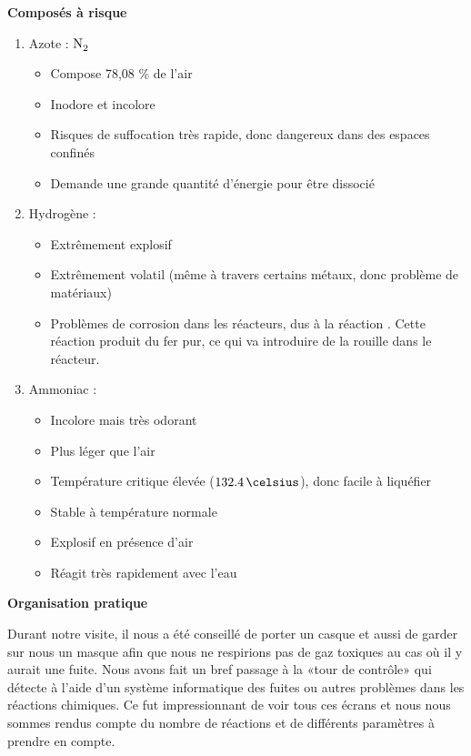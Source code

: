 \textbf{Composés à risque}
\begin{enumerate}
\item Azote : $\ce{N2}$
\begin{itemize}
\item Compose 78,08 \% de l'air
\item Inodore et incolore 
\item Risques de suffocation très rapide, donc dangereux dans des espaces confinés
\item Demande une grande quantité d'énergie pour être dissocié
\end{itemize}
\item Hydrogène : 
\begin{itemize}
\item Extrêmement explosif
\item Extrêmement volatil (même à travers certains métaux, donc problème de matériaux)
\item Problèmes de corrosion dans les réacteurs, dus à la réaction
.
Cette réaction produit du fer pur, ce qui va introduire de la rouille dans le réacteur.
\end{itemize}

\item Ammoniac : 
\begin{itemize}
\item Incolore mais très odorant
\item Plus léger que l'air
\item Température critique élevée ($132.4\,\celsius$), donc facile à liquéfier
\item Stable à température normale
\item Explosif en présence d'air
\item Réagit très rapidement avec l'eau
\end{itemize}
\end{enumerate}

\textbf{Organisation pratique}

Durant notre visite, il nous a été conseillé de porter un casque et aussi de garder sur nous un masque afin que nous ne respirions pas de gaz toxiques au cas où il y aurait une fuite. Nous avons fait un bref passage à la «tour de contrôle» qui détecte à l'aide d'un système informatique des fuites ou autres problèmes dans les réactions chimiques. Ce fut impressionnant de voir tous ces écrans et nous nous sommes rendus compte du nombre de réactions et de différents paramètres à prendre en compte.

